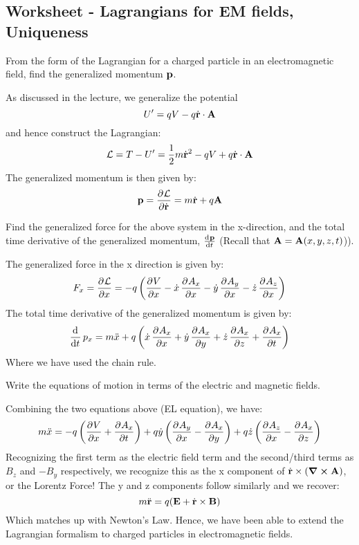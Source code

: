 \subsection{Worksheet - Lagrangians for EM fields, Uniqueness}
\begin{p}
From the form of the Lagrangian for a charged particle in an electromagnetic field, find the generalized momentum $\mathbf{p}$.
\end{p}
\begin{s}
As discussed in the lecture, we generalize the potential \[U' = qV - q\dot{\mathbf{r}}\cdot\mathbf{A}\]
and hence construct the Lagrangian:
\[\mathcal{L} = T - U' = \frac{1}{2}m\dot{\mathbf{r}}^2 - qV + q\dot{\mathbf{r}}\cdot\mathbf{A}\]
The generalized momentum is then given by:
\[\v{p} = \dpd{\LL}{\dot{\v{r}}} = m\dot{\v{r}} + q\v{A}\]
\end{s}

\begin{p}
Find the generalized force for the above system in the x-direction, and the total time derivative of the generalized momentum, $\od{\v{p}}{t}$ (Recall that $\mathbf{A} = \mathbf{A}(x,y,z,t)$)).
\end{p}
\begin{s}
The generalized force in the x direction is given by:
\[F_x = \dpd{\LL}{x} = -q\left(\dpd{V}{x} - \dot{x}\dpd{A_x}{x} - \dot{y}\dpd{A_y}{x} - \dot{z}\dpd{A_z}{x}\right)\]
The total time derivative of the generalized momentum is given by:
\[\dod{}{t}p_x = m\ddot{x} + q\left(\dot{x}\dpd{A_x}{x} + \dot{y}\dpd{A_x}{y} + \dot{z}\dpd{A_x}{z} + \dpd{A_x}{t}\right)\]
Where we have used the chain rule. 
\end{s}

\begin{p}
Write the equations of motion in terms of the electric and magnetic fields.
\end{p}
\begin{s}
Combining the two equations above (EL equation), we have:
\[m\ddot{x} = -q\left(\dpd{V}{x} + \dpd{A_x}{t}\right) + q\dot{y}\left(\dpd{A_y}{x} - \dpd{A_x}{y}\right) + q\dot{z}\left(\dpd{A_z}{x} - \dpd{A_x}{z}\right)\]
Recognizing the first term as the electric field term and the second/third terms as $B_z$ and $-B_y$ respectively, we recognize this as the x component of $\dot{\mathbf{r}}\times \left(\curl{\ensuremath{\mathbf{A}}}\right)$, or the Lorentz Force! The y and z components follow similarly and we recover:
\[m\ddot{\mathbf{r}} = q(\mathbf{E} + \dot{\mathbf{r}}\times\mathbf{B})\]
Which matches up with Newton's Law. Hence, we have been able to extend the Lagrangian formalism to charged particles in electromagnetic fields.
\end{s}

